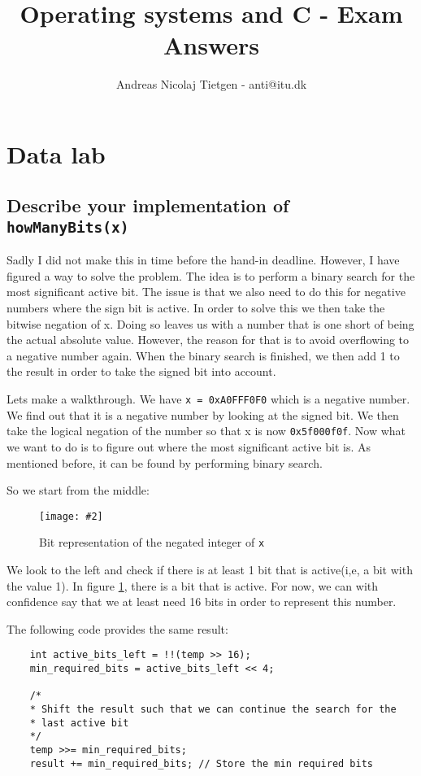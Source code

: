 \documentclass[11pt]{article}
\title{Operating systems and C - Exam Answers}
\author{Andreas Nicolaj Tietgen - anti@itu.dk}
\newcommand{\code}[1]{{\colorbox{lightgray!15}{\color{black}\texttt{#1}}}}
\newcommand{\centeredpic}[4][0.5]{
    \begin{figure}[h]
        \texttt{[image: \#2]}
        \centering
        \caption{#3}
        \label{fig:#4}
    \end{figure}
}
\begin{document}
\maketitle

\tableofcontents

\section{Data lab}

\subsection{Describe your implementation of \code{howManyBits(x)}}
Sadly I did not make this in time before the hand-in deadline. However, I have figured a way to 
solve the problem. The idea is to perform a binary search for the most significant active bit.
The issue is that we also need to do this for negative numbers where the sign bit is active. In order to 
solve this we then take the bitwise negation of x. Doing so leaves us with a number that is one short of being the
actual absolute value. However, the reason for that is to avoid overflowing to a negative number again. 
When the binary search is finished, we then add 1 to the result in order to take the signed bit into account.

Lets make a walkthrough. We have \code{x = 0xA0FFF0F0} which is a negative number.
We find out that it is a negative number by looking at the signed bit. We then take the
logical negation of the number so that x is now \code{0x5f000f0f}. 
Now what we want to do is to figure out where the most significant active bit is. As mentioned before,
it can be found by performing binary search. 

So we start from the middle:

\centeredpic{howmanybits-01.png}{Bit representation of the negated integer of \code{x}}{hmb-step-1}

We look to the left and check if there is at least 1 bit that is active(i,e, a bit with the value 1). In figure \ref{fig:hmb-step-1}, there is a bit that is active.
For now, we can with confidence say that we at least need 16 bits in order to represent this number.

The following code provides the same result:
\begin{lstlisting}
    int active_bits_left = !!(temp >> 16);
    min_required_bits = active_bits_left << 4;
    
    /* 
    * Shift the result such that we can continue the search for the 
    * last active bit 
    */
    temp >>= min_required_bits;
    result += min_required_bits; // Store the min required bits
\end{lstlisting}
\end{document}

